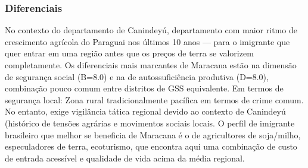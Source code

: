 \subsubsection*{Diferenciais}\label{dif-maracana-1414}
No contexto do departamento de Canindeyú, departamento com maior ritmo de crescimento agrícola do Paraguai nos últimos 10 anos — para o imigrante que quer entrar em uma região antes que os preços de terra se valorizem completamente. Os diferenciais mais marcantes de Maracana estão na dimensão de segurança social (B=8.0) e na de autossuficiência produtiva (D=8.0), combinação pouco comum entre distritos de GSS equivalente. Em termos de segurança local: Zona rural tradicionalmente pacífica em termos de crime comum. No entanto, exige vigilância tática regional devido ao contexto de Canindeyú (histórico de tensões agrárias e movimentos sociais locais. O perfil de imigrante brasileiro que melhor se beneficia de Maracana é o de agricultores de soja/milho, especuladores de terra, ecoturismo, que encontra aqui uma combinação de custo de entrada acessível e qualidade de vida acima da média regional.
